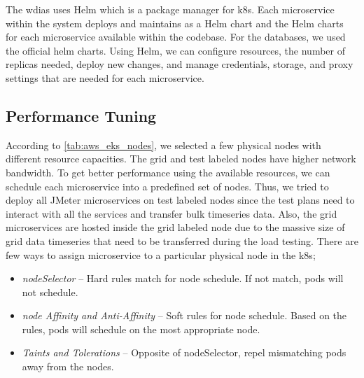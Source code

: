 The \acrshort{wdias} uses Helm \cite{CNCFHelmDocs} which is a package manager for \acrshort{k8s}. Each microservice within the system deploys and maintains as a Helm chart and the Helm charts \cite{KarunarathneWdias-helm-charts:Deployments} for each microservice available within the codebase. For the databases, we used the official helm charts. Using Helm, we can configure resources, the number of replicas needed, deploy new changes, and manage credentials, storage, and proxy settings that are needed for each microservice.


\subsection{Performance Tuning}
\label{se:performance_tuning}
According to \cref{tab:aws_eks_nodes}, we selected a few physical nodes with different resource capacities. The grid and test labeled nodes have higher network bandwidth. To get better performance using the available resources, we can schedule each microservice into a predefined set of nodes. Thus, we tried to deploy all JMeter microservices on test labeled nodes since the test plans need to interact with all the services and transfer bulk timeseries data. Also, the grid microservices are hosted inside the grid labeled node due to the massive size of grid data timeseries that need to be transferred during the load testing. There are few ways to assign microservice to a particular physical node in the \acrshort{k8s};

\begin{itemize}
    \item \emph{nodeSelector} -- Hard rules match for node schedule. If not match, pods will not schedule.
    \item \emph{node Affinity and Anti-Affinity} -- Soft rules for node schedule. Based on the rules, pods will schedule on the most appropriate node.
    \item \emph{Taints and Tolerations} -- Opposite of nodeSelector, repel mismatching pods away from the nodes.
\end{itemize}

